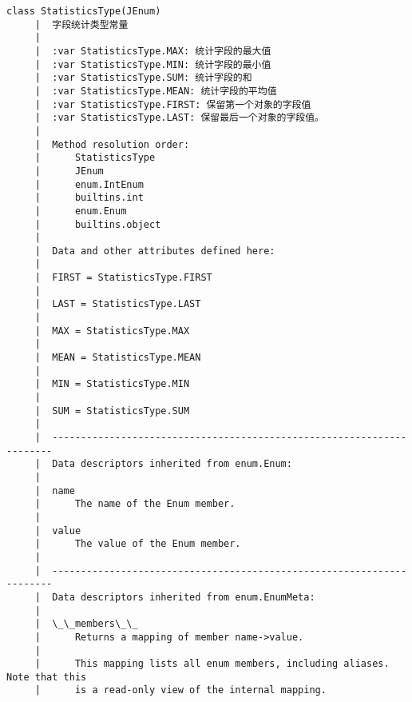 \documentclass[11pt]{article}
\begin{document}
\begin{Verbatim}[commandchars=\\\{\}]
    class StatisticsType(JEnum)
     |  字段统计类型常量
     |  
     |  :var StatisticsType.MAX: 统计字段的最大值
     |  :var StatisticsType.MIN: 统计字段的最小值
     |  :var StatisticsType.SUM: 统计字段的和
     |  :var StatisticsType.MEAN: 统计字段的平均值
     |  :var StatisticsType.FIRST: 保留第一个对象的字段值
     |  :var StatisticsType.LAST: 保留最后一个对象的字段值。
     |  
     |  Method resolution order:
     |      StatisticsType
     |      JEnum
     |      enum.IntEnum
     |      builtins.int
     |      enum.Enum
     |      builtins.object
     |  
     |  Data and other attributes defined here:
     |  
     |  FIRST = StatisticsType.FIRST
     |  
     |  LAST = StatisticsType.LAST
     |  
     |  MAX = StatisticsType.MAX
     |  
     |  MEAN = StatisticsType.MEAN
     |  
     |  MIN = StatisticsType.MIN
     |  
     |  SUM = StatisticsType.SUM
     |  
     |  ----------------------------------------------------------------------
     |  Data descriptors inherited from enum.Enum:
     |  
     |  name
     |      The name of the Enum member.
     |  
     |  value
     |      The value of the Enum member.
     |  
     |  ----------------------------------------------------------------------
     |  Data descriptors inherited from enum.EnumMeta:
     |  
     |  \_\_members\_\_
     |      Returns a mapping of member name->value.
     |      
     |      This mapping lists all enum members, including aliases. Note that this
     |      is a read-only view of the internal mapping.
    

\end{Verbatim}
\end{document}
